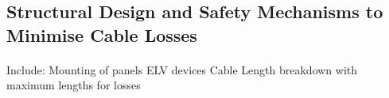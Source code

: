\subsection{Structural Design and Safety Mechanisms to Minimise Cable Losses}

\paragraph{}
Include:
\newline
Mounting of panels
ELV devices
Cable Length breakdown with maximum lengths for losses